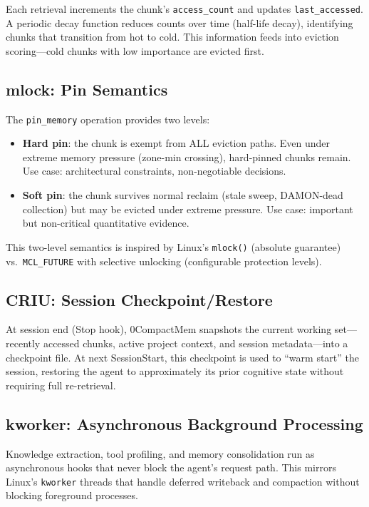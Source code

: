 \documentclass[10pt,twocolumn]{article}
\begin{document}
Each retrieval increments the chunk's \texttt{access\_count} and updates \texttt{last\_accessed}. A periodic decay function reduces counts over time (half-life decay), identifying chunks that transition from hot to cold. This information feeds into eviction scoring---cold chunks with low importance are evicted first.

\subsection{mlock: Pin Semantics}

The \texttt{pin\_memory} operation provides two levels:
\begin{itemize}[leftmargin=*,nosep]
  \item \textbf{Hard pin}: the chunk is exempt from ALL eviction paths. Even under extreme memory pressure (zone-min crossing), hard-pinned chunks remain. Use case: architectural constraints, non-negotiable decisions.
  \item \textbf{Soft pin}: the chunk survives normal reclaim (stale sweep, DAMON-dead collection) but may be evicted under extreme pressure. Use case: important but non-critical quantitative evidence.
\end{itemize}

This two-level semantics is inspired by Linux's \texttt{mlock()} (absolute guarantee) vs.\ \texttt{MCL\_FUTURE} with selective unlocking (configurable protection levels).

\subsection{CRIU: Session Checkpoint/Restore}

At session end (Stop hook), 0CompactMem snapshots the current working set---recently accessed chunks, active project context, and session metadata---into a checkpoint file. At next SessionStart, this checkpoint is used to ``warm start'' the session, restoring the agent to approximately its prior cognitive state without requiring full re-retrieval.

\subsection{kworker: Asynchronous Background Processing}

Knowledge extraction, tool profiling, and memory consolidation run as asynchronous hooks that never block the agent's request path. This mirrors Linux's \texttt{kworker} threads that handle deferred writeback and compaction without blocking foreground processes.
\end{document}
